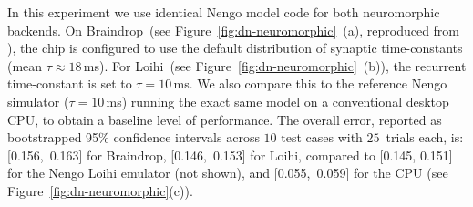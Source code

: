 In this experiment we use identical Nengo model code for both neuromorphic backends.
On Braindrop~(see Figure~\ref{fig:dn-neuromorphic}~(a), reproduced from \citet[][Figure~16]{braindrop2019}),
the chip is configured to use the default distribution of synaptic time-constants (mean $\tau \approx 18$\,ms).
For Loihi~(see Figure~\ref{fig:dn-neuromorphic}~(b)), the recurrent time-constant is set to $\tau=10$\,ms.
We also compare this to the reference Nengo simulator ($\tau=10$\,ms) running the exact same model on a conventional desktop CPU, to obtain a baseline level of performance.
The overall error, reported as bootstrapped 95\% confidence intervals across $10$ test cases with $25$~trials each, is:
[0.156,~0.163] for Braindrop,
[0.146,~0.153] for Loihi,
compared to [0.145, 0.151] for the Nengo Loihi emulator (not shown), and
[0.055,~0.059] for the CPU (see Figure~\ref{fig:dn-neuromorphic}(c)).

